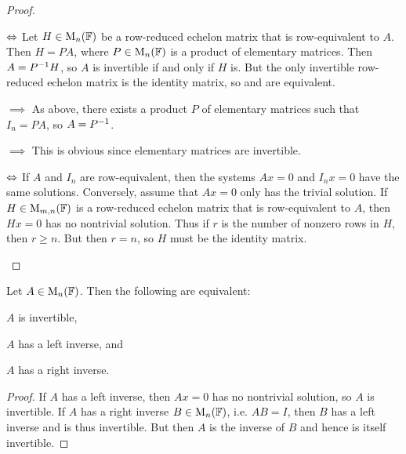 \begin{proof}
\begin{proofsec*}
    \item[\itemref{enum:lemma-A-invertible} $\Leftrightarrow$ \itemref{enum:lemma-A-equivalent-to-I}]
    Let $H \in \mathrm{M}_{n}(\mathbb{F})$ be a row-reduced echelon matrix that is row-equivalent to $A$. Then $H = PA$, where $P \in \mathrm{M}_{n}(\mathbb{F})$ is a product of elementary matrices. Then $A = {P}^{-1} H$, so $A$ is invertible if and only if $H$ is. But the only invertible row-reduced echelon matrix is the identity matrix, so  and  are equivalent.
    
    \item[\itemref{enum:lemma-A-equivalent-to-I} $\implies$ \itemref{enum:lemma-A-elementary-matrix-product}]
    As above, there exists a product $P$ of elementary matrices such that $I_n = PA$, so $A = {P}^{-1}$.

    \item[\itemref{enum:lemma-A-elementary-matrix-product} $\implies$ \itemref{enum:lemma-A-invertible}]
    This is obvious since elementary matrices are invertible.

    \item[\itemref{enum:lemma-A-equivalent-to-I} $\Leftrightarrow$ \itemref{enum:lemma-only-trivial-solution}]
    If $A$ and $I_n$ are row-equivalent, then the systems $Ax = 0$ and $I_n x = 0$ have the same solutions. Conversely, assume that $Ax = 0$ only has the trivial solution. If $H \in \mathrm{M}_{m,n}(\mathbb{F})$ is a row-reduced echelon matrix that is row-equivalent to $A$, then $Hx = 0$ has no nontrivial solution. Thus if $r$ is the number of nonzero rows in $H$, then $r \geq n$. But then $r = n$, so $H$ must be the identity matrix.
\end{proofsec*}
\end{proof}


\begin{proposition}
    Let $A \in \mathrm{M}_{n}(\mathbb{F})$. Then the following are equivalent:
    \begin{enumproposition}
        \item $A$ is invertible,
        \item $A$ has a left inverse, and
        \item $A$ has a right inverse.
    \end{enumproposition}
\end{proposition}

\begin{proof}
    If $A$ has a left inverse, then $Ax = 0$ has no nontrivial solution, so $A$ is invertible. If $A$ has a right inverse $B \in \mathrm{M}_{n}(\mathbb{F})$, i.e. $AB = I$, then $B$ has a left inverse and is thus invertible. But then $A$ is the inverse of $B$ and hence is itself invertible.
\end{proof}
